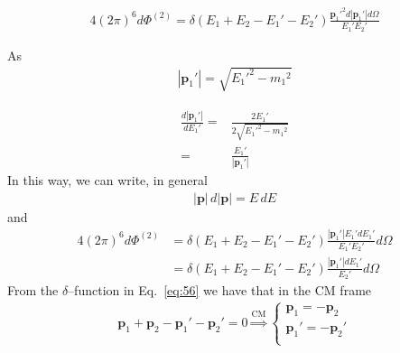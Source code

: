 \begin{align}
  4(2\pi)^6d\Phi^{(2)}=\delta(E_1+E_2-E_1'-E_2')
  \frac{{\mathbf{p}_1'}^2d|\mathbf{p}_1'|d\Omega}{E_{1}'E_{2}'}
\end{align}

As
\begin{align}
  |\mathbf{p}_1'|=\sqrt{{E_1'}^2-{m_1}^2}
\end{align}

\begin{align}
  \frac{d|\mathbf{p}_1'|}{dE_1'}=&\frac{2E_1'}{2\sqrt{{E_1'}^2-{m_1}^2}}\nonumber\\
  =&\frac{E_1'}{|\mathbf{p}_1'|}
\end{align}
In this way, we can write, in general
\begin{align}
 |\mathbf{p}|\, d|\mathbf{p}|=E\,dE
\end{align}
and
\begin{align}
\label{eq:57}
 4(2\pi)^6 d\Phi^{(2)}&=\delta(E_1+E_2-E_1'-E_2')
\frac{|\mathbf{p}_1'|E_1'dE_1'}{E_{1}'E_{2}'}d\Omega\nonumber\\
  &=\delta(E_1+E_2-E_1'-E_2')
\frac{|\mathbf{p}_1'|dE_1'}{E_{2}'}d\Omega
\end{align}
From the $\delta$--function in Eq.~\eqref{eq:56} we have that in the CM frame
\begin{align}
  \mathbf{p}_1+\mathbf{p}_2-\mathbf{p}_1'-\mathbf{p}_2'=0 \overset{\text{CM}}{\Rightarrow}
  \begin{cases}
    \mathbf{p}_1=-\mathbf{p}_2\\
    \mathbf{p}_1'=-\mathbf{p}_2'\\
  \end{cases}
\end{align}

